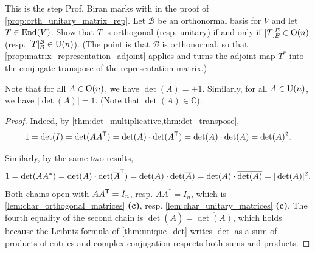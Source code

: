 \begin{exercise}
\label{exc:orth_unitary_matrix_rep}
This is the step Prof. Biran marks with  in the proof of \cref{prop:orth_unitary_matrix_rep}. Let $\mathcal{B}$ be an orthonormal basis for $V$ and let $T \in \operatorname{End}(V)$. Show that $T$ is orthogonal (resp. unitary) if and only if $[T]_{\mathcal{B}}^{\mathcal{B}} \in \operatorname{O}(n)$ (resp. $[T]_{\mathcal{B}}^{\mathcal{B}} \in \operatorname{U}(n)$). (The point is that $\mathcal{B}$ is orthonormal, so that \cref{prop:matrix_representation_adjoint} applies and turns the adjoint map $T^*$ into the conjugate transpose of the representation matrix.)
\end{exercise}

\begin{proposition*}
\label{prop:det_orth_unit_matrices}
Note that for all $A \in \operatorname{O}(n)$, we have $\det(A) = \pm 1$. Similarly, for all $A \in \operatorname{U}(n)$, we have $|\det(A)| = 1$. (Note that $\det(A) \in \mathbb{C}$).
\end{proposition*}

\begin{proof}
Indeed, by \cref{thm:det_multiplicative,thm:det_transpose},
\[ 1 = \det(I) = \det(AA^{\mathsf{T}}) = \det(A) \cdot \det(A^{\mathsf{T}}) = \det(A) \cdot \det(A) = \det(A)^2. \]

Similarly, by the same two results,
\[ 1 = \det(AA^*) = \det(A) \cdot \det(\overline{A}^{\mathsf{T}}) = \det(A) \cdot \det(\overline{A}) = \det(A) \cdot \overline{\det(A)} = |\det(A)|^2. \]
Both chains open with $A A^{\mathsf{T}} = I_n$, resp. $A A^* = I_n$, which is \cref{lem:char_orthogonal_matrices} \textbf{(c)}, resp. \cref{lem:char_unitary_matrices} \textbf{(c)}. The fourth equality of the second chain is $\det(\overline{A}) = \overline{\det(A)}$, which holds because the Leibniz formula of \cref{thm:unique_det} writes $\det$ as a sum of products of entries and complex conjugation respects both sums and products.
\end{proof}

